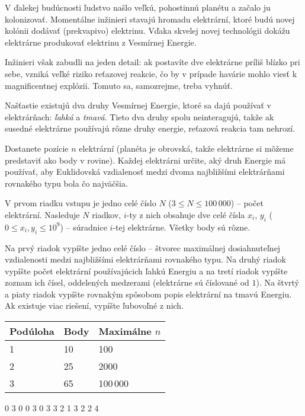 
\usepackage[slovak]{babel}




V ďalekej budúcnosti ľudstvo našlo veľkú, pohostinnú planétu a začalo ju kolonizovať. Momentálne inžinieri stavajú
hromadu elektrární, ktoré budú novej kolónii dodávať (prekvapivo) elektrinu. Vďaka skvelej novej
technológii dokážu elektrárne produkovať elektrinu z Vesmírnej Energie. 

Inžinieri však zabudli na jeden detail: ak postavíte dve elektrárne príliš blízko pri sebe, vzniká veľké riziko reťazovej reakcie, čo by v prípade havárie mohlo viesť k magnificentnej explózii. Tomuto sa, samozrejme, treba vyhnúť.

Našťastie existujú dva druhy Vesmírnej Energie, ktoré sa dajú používať v elektrárňach: \textit{ľahká}
a \textit{tmavá}. Tieto dva druhy spolu neinteragujú, takže ak susedné elektrárne používajú rôzne druhy
energie, reťazová reakcia tam nehrozí.


Dostanete pozície $n$ elektrární (planéta je obrovská, takže elektrárne si môžeme predstaviť ako body v rovine). Každej elektrárni určite, aký druh Energie má používať, aby Euklidovská vzdialenosť medzi
dvoma najbližšími elektrárňami rovnakého typu bola čo najväčšia.


V prvom riadku vstupu je jedno celé číslo $N$ ($3 \leq N \leq 100\,000$) -- počet elektrární.
Nasleduje $N$ riadkov, $i$-ty z nich obsahuje dve celé čísla $x_i$, $y_i$ ($0 \leq x_i, y_i \leq 10^9$) -- súradnice $i$-tej elektrárne. Všetky body sú rôzne.


Na prvý riadok vypíšte jedno celé číslo -- štvorec maximálnej dosiahnuteľnej vzdialenosti medzi najbližšími elektrárňami rovnakého typu.
Na druhý riadok vypíšte počet elektrární používajúcich ľahkú Energiu a na tretí riadok vypíšte zoznam
ich čísel, oddelených medzerami (elektrárne sú číslované od $1$).
Na štvrtý a piaty riadok vypíšte rovnakým spôsobom popis elektrární na tmavú Energiu. Ak existuje viac
riešení, vypíšte ľubovoľné z nich.


\begin{center}
\begin{tabular}{|l|l|l|}
\hline
Podúloha & Body & Maximálne $n$  \\ \hline
1       & 10     & 100           \\ \hline
2       & 25     & 2000         \\ \hline
3       & 65     & 100\,000       \\ \hline
\end{tabular}
\end{center}



0 3
0 0
3 0
3 3
2
1 3
2
2 4
\sampleCOMMENT
\sampleEND




